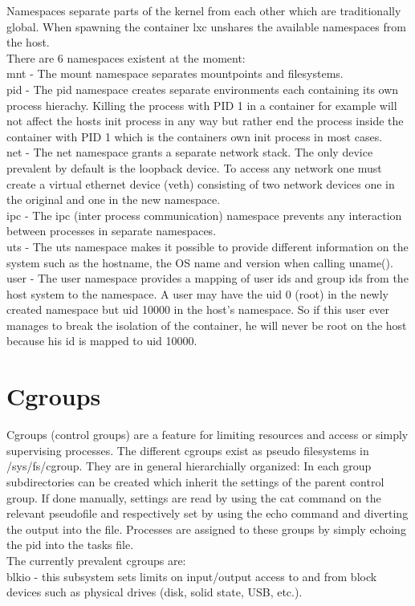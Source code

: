 Namespaces separate parts of the kernel from each other which are traditionally global. When spawning the container lxc unshares
the available namespaces from the host.\\
There are 6 namespaces existent at the moment:\\
mnt - The mount namespace separates mountpoints and filesystems.\\
pid - The pid namespace creates separate environments each containing its own process hierachy. Killing the process with PID 1
in a container for example will not affect the hosts init process in any way but rather end the process inside the container with PID 1
which is the containers own init process in most cases.\\
net - The net namespace grants a separate network stack. The only device prevalent by default is the loopback device. To access any network
one must create a virtual ethernet device (veth) consisting of two network devices one in the original and one in the new namespace.\\
ipc - The ipc (inter process communication) namespace prevents any interaction between processes in separate namespaces.\\
uts - The uts namespace makes it possible to provide different information on the system such as the hostname, the OS name and version
when calling uname().\\
user - The user namespace provides a mapping of user ids and group ids from the host system to the namespace. A user may have the uid 0
(root) in the newly created namespace but uid 10000 in the host's namespace. So if this user ever manages to break the isolation of the
container, he will never be root on the host because his id is mapped to uid 10000.\\

\section{Cgroups}

Cgroups (control groups) are a feature for limiting resources and access or simply supervising processes. The different cgroups exist as
pseudo filesystems in /sys/fs/cgroup. They are in general hierarchially organized: In each group subdirectories can be created
which inherit the settings of the parent control group. If done manually, settings are read by using the cat command on the relevant
pseudofile and respectively set by using the echo command and diverting the output into the file. Processes are assigned to these groups
by simply echoing the pid into the tasks file.\\
The currently prevalent cgroups are:\\
blkio - this subsystem sets limits on input/output access to and from block devices such as physical drives (disk, solid state, USB, etc.). 

